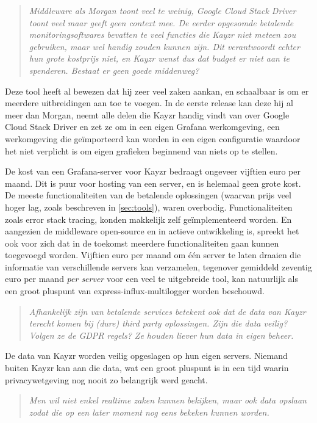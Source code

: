 \begin{quote}
	\textit{Middleware als Morgan toont veel te weinig, Google Cloud Stack Driver toont veel maar geeft geen context mee. De eerder opgesomde betalende monitoringsoftwares bevatten te veel functies die Kayzr niet meteen zou gebruiken, maar wel handig \textit{zouden kunnen} zijn. Dit verantwoordt echter hun grote kostprijs niet, en Kayzr wenst dus dat budget er niet aan te spenderen. Bestaat er geen goede middenweg?}
\end{quote}

Deze tool heeft al bewezen dat hij zeer veel zaken aankan, en schaalbaar is om er meerdere uitbreidingen aan toe te voegen. In de eerste release kan deze hij al meer dan Morgan, neemt alle delen die Kayzr handig vindt van over Google Cloud Stack Driver en zet ze om in een eigen Grafana werkomgeving, een werkomgeving die geïmporteerd kan worden in een eigen configuratie waardoor het niet verplicht is om eigen grafieken beginnend van niets op te stellen.

De kost van een Grafana-server voor Kayzr bedraagt ongeveer vijftien euro per maand. Dit is puur voor hosting van een server, en is helemaal geen grote kost. De meeste functionaliteiten van de betalende oplossingen (waarvan prijs veel hoger lag, zoals beschreven in \ref{sec:tools}), waren overbodig. Functionaliteiten zoals error stack tracing, konden makkelijk zelf geïmplementeerd worden. En aangezien de middleware open-source en in actieve ontwikkeling is, spreekt het ook voor zich dat in de toekomst meerdere functionaliteiten gaan kunnen toegevoegd worden. Vijftien euro per maand om één server te laten draaien die informatie van verschillende servers kan verzamelen, tegenover gemiddeld zeventig euro per maand \textit{per server} voor een veel te uitgebreide tool, kan natuurlijk als een groot pluspunt van express-influx-multilogger worden beschouwd.

\begin{quote}
	\textit{Afhankelijk zijn van betalende services betekent ook dat de data van Kayzr terecht komen bij (dure) third party oplossingen. Zijn die data veilig? Volgen ze de GDPR regels? Ze houden liever hun data in eigen beheer.}
\end{quote}

De data van Kayzr worden veilig opgeslagen op hun eigen servers. Niemand buiten Kayzr kan aan die data, wat een groot pluspunt is in een tijd waarin privacywetgeving nog nooit zo belangrijk werd geacht.

\begin{quote}
	\textit{Men wil niet enkel realtime zaken kunnen bekijken, maar ook data opslaan zodat die op een later moment nog eens bekeken kunnen worden.}
\end{quote}

